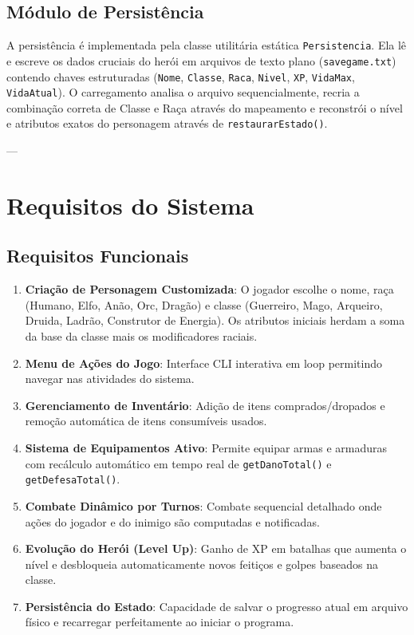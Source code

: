\documentclass[12pt,a4paper]{article}
\begin{document}
\subsection{Módulo de Persistência}
A persistência é implementada pela classe utilitária estática \texttt{Persistencia}. Ela lê e escreve os dados cruciais do herói em arquivos de texto plano (\texttt{savegame.txt}) contendo chaves estruturadas (\texttt{Nome}, \texttt{Classe}, \texttt{Raca}, \texttt{Nivel}, \texttt{XP}, \texttt{VidaMax}, \texttt{VidaAtual}). O carregamento analisa o arquivo sequencialmente, recria a combinação correta de Classe e Raça através do mapeamento e reconstrói o nível e atributos exatos do personagem através de \texttt{restaurarEstado()}.

---

\section{Requisitos do Sistema}

\subsection{Requisitos Funcionais}
\begin{enumerate}
    \item \textbf{Criação de Personagem Customizada}: O jogador escolhe o nome, raça (Humano, Elfo, Anão, Orc, Dragão) e classe (Guerreiro, Mago, Arqueiro, Druida, Ladrão, Construtor de Energia). Os atributos iniciais herdam a soma da base da classe mais os modificadores raciais.
    \item \textbf{Menu de Ações do Jogo}: Interface CLI interativa em loop permitindo navegar nas atividades do sistema.
    \item \textbf{Gerenciamento de Inventário}: Adição de itens comprados/dropados e remoção automática de itens consumíveis usados.
    \item \textbf{Sistema de Equipamentos Ativo}: Permite equipar armas e armaduras com recálculo automático em tempo real de \texttt{getDanoTotal()} e \texttt{getDefesaTotal()}.
    \item \textbf{Combate Dinâmico por Turnos}: Combate sequencial detalhado onde ações do jogador e do inimigo são computadas e notificadas.
    \item \textbf{Evolução do Herói (Level Up)}: Ganho de XP em batalhas que aumenta o nível e desbloqueia automaticamente novos feitiços e golpes baseados na classe.
    \item \textbf{Persistência do Estado}: Capacidade de salvar o progresso atual em arquivo físico e recarregar perfeitamente ao iniciar o programa.
\end{enumerate}
\end{document}
